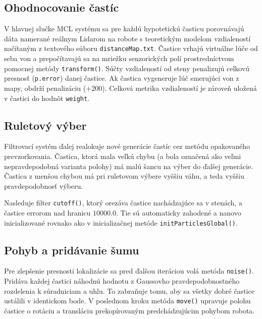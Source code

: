 \subsection{Ohodnocovanie častíc}
V hlavnej slučke MCL systému sa pre každú hypotetickú časticu porovnávajú dáta namerané reálnym Lidarom na robote s teoretickým modelom vzdialeností načítaným z textového súboru \texttt{distanceMap.txt}. Častice vrhajú virtuálne lúče od seba von a prepočítavajú sa na mriežku senzorických polí prostredníctvom pomocnej metódy \texttt{transform()}. Súčty vzdialeností od steny penalizujú celkovú presnosť (\texttt{p.error}) danej častice. Ak častica vygeneruje lúč smerujúci von z mapy, obdrží penalizáciu ($+200$). Celková metrika vzdialeností je zároveň uložená v častici do hodnôt \texttt{weight}.

\subsection{Ruletový výber}
Filtrovací systém ďalej realokuje nové generácie častíc cez metódu opakovaného prevzorkovania. Častica, ktorá mala veľkú chybu (a bola označená ako veľmi nepravdepodobná varianta polohy) má malú šancu na výber do ďalšej generácie. Častica z menšou chybou má pri ruletovom výbere vyššiu váhu, a teda vyššiu pravdepodobnosť výberu.

Nasleduje filter \texttt{cutoff()}, ktorý orezáva častice nachádzajúce sa v stenách, a častice errorom nad hranicu $10000.0$. Tie sú automaticky zahodené a nanovo inicializované rovnako ako v inicializačnej metóde \texttt{initParticlesGlobal()}.

\subsection{Pohyb a pridávanie šumu}
Pre zlepšenie presnosti lokalizácie sa pred ďalšou iteráciou volá metóda \texttt{noise()}. Pridáva každej častici náhodnú hodnotu z Gaussovho pravdepodobnostného rozdelenia k súradniciam a uhlu. To zabraňuje tomu, aby sa všetky dobré častice ustálili v identickom bode. V poslednom kroku metóda \texttt{move()} upravuje polohu častice o rotáciu a transláciu prekopírovaným predchádzujúcim pohybom robota. 

